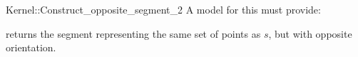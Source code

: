 \begin{ccRefFunctionObjectConcept}{Kernel::Construct_opposite_segment_2}
A model for this must provide:


{returns the segment representing the same set of points as $s$,
but with opposite orientation.}

\ccIsModel{}

\end{ccRefFunctionObjectConcept}
